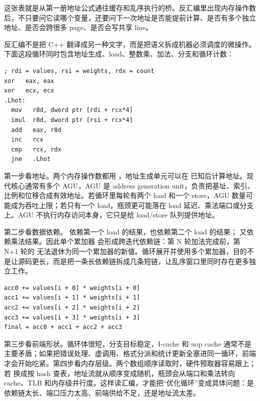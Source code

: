 这张表就是从第一册地址公式通往缓存和乱序执行的桥。反汇编里出现内存操作数后，不只要问它读哪个变量，还要问下一次地址是否能提前计算、是否有多个独立地址、是否会跨很多 page、是否会写共享 line。

反汇编不是把 C++ 翻译成另一种文字，而是把语义拆成机器必须调度的微操作。下面这段循环同时包含地址生成、load、整数乘、加法、分支和循环计数：

\begin{lstlisting}[numbers=none,caption={热循环的微架构判读入口}]
; rdi = values, rsi = weights, rdx = count
xor   eax, eax
xor   ecx, ecx
.Lhot:
  mov   r8d, dword ptr [rdi + rcx*4]
  imul  r8d, dword ptr [rsi + rcx*4]
  add   eax, r8d
  inc   rcx
  cmp   rcx, rdx
  jne   .Lhot
\end{lstlisting}

第一步看地址。两个内存操作数都用 ，地址生成单元可以在  已知后计算地址。现代核心通常有多个 AGU，AGU 是 address generation unit，负责把基址、索引、比例和位移合成有效地址。若循环里每轮有两个 load 和一个 store，AGU 数量可能成为吞吐上限；若只有一个 load，瓶颈更可能落在 load 延迟、乘法端口或分支上。AGU 不执行内存访问本身，它只是给 load/store 队列提供地址。

第二步看数据依赖。 依赖第一个 load 的结果，也依赖第二个 load 的结果； 又依赖乘法结果。因此单个累加器  会形成跨迭代依赖链：第 N 轮加法完成前，第 N+1 轮的  无法退休为同一个累加器的新值。循环展开并使用多个累加器，目的不是让源码更长，而是把一条长依赖链拆成几条短链，让乱序窗口里同时存在更多独立工作。

\begin{lstlisting}[numbers=none,caption={多累加器把一条依赖链拆成多条}]
acc0 += values[i + 0] * weights[i + 0]
acc1 += values[i + 1] * weights[i + 1]
acc2 += values[i + 2] * weights[i + 2]
acc3 += values[i + 3] * weights[i + 3]
final = acc0 + acc1 + acc2 + acc3
\end{lstlisting}

第三步看前端形状。循环体很短，分支目标稳定，I-cache 和 uop cache 通常不是主要矛盾；如果把错误处理、虚调用、格式分派和统计更新全塞进同一循环，前端才会开始吃紧。第四步看内存层级。两个数组顺序读取时，硬件预取器容易跟上；若  换成按 hash 查表，地址流就从顺序变成随机，瓶颈会从端口和乘法转向 cache、TLB 和内存级并行度。这样读汇编，才能把“优化循环”变成具体问题：是依赖链太长、端口压力太高、前端供给不足，还是地址流太差。

